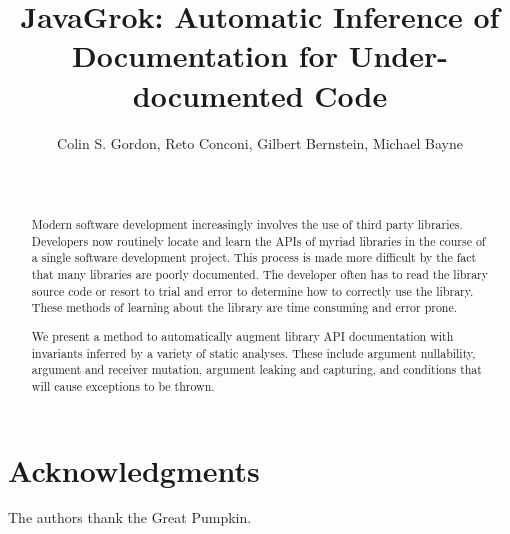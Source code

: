 \documentclass{sig-alternate}
\begin{document}

\title{JavaGrok: Automatic Inference of Documentation for Under-documented Code}

\author{
\alignauthor
Colin S. Gordon, Reto Conconi, Gilbert Bernstein, Michael Bayne\\
       \\
       \\
}

\maketitle
\begin{abstract}
Modern software development increasingly involves the use of third party
libraries. Developers now routinely locate and learn the APIs of myriad
libraries in the course of a single software development project. This process
is made more difficult by the fact that many libraries are poorly documented.
The developer often has to read the library source code or resort to trial and
error to determine how to correctly use the library. These methods of learning
about the library are time consuming and error prone.

We present a method to automatically augment library API documentation with invariants
inferred by a variety of static analyses. These include argument nullability,
argument and receiver mutation, argument leaking and capturing, and conditions
that will cause exceptions to be thrown.
\end{abstract}














\section{Acknowledgments}
The authors thank the Great Pumpkin.



\end{document}
